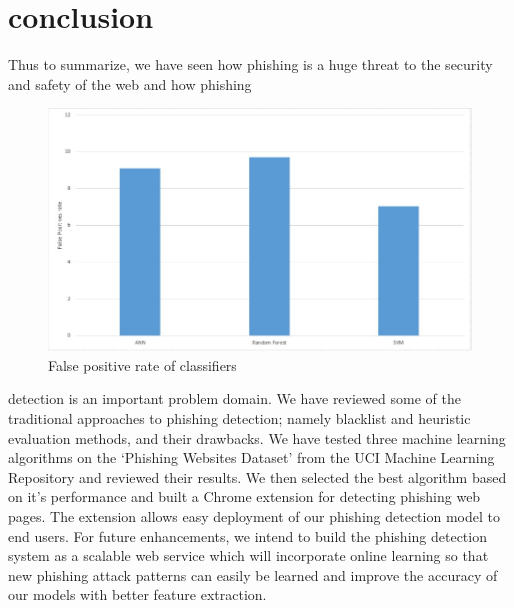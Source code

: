 \documentclass[conference]{IEEEtran}
\begin{document}
\section{conclusion}
Thus to summarize, we have seen how phishing is a huge
threat to the security and safety of the web and how phishing
\begin{figure}
    \centering
    \includegraphics[width=\linewidth]{Fig4.jpg}
    \caption{False positive rate of classifiers}
    \label{fig:4}
\end{figure}
detection is an important problem domain. We have reviewed
some of the traditional approaches to phishing detection;
namely blacklist and heuristic evaluation methods, and their
drawbacks. We have tested three machine learning algorithms
on the ‘Phishing Websites Dataset’ from the UCI Machine
Learning Repository and reviewed their results. We then selected
the best algorithm based on it’s performance and built
a Chrome extension for detecting phishing web pages. The
extension allows easy deployment of our phishing detection
model to end users. For future enhancements, we intend to
build the phishing detection system as a scalable web service
which will incorporate online learning so that new phishing
attack patterns can easily be learned and improve the accuracy
of our models with better feature extraction.

%
%
\end{document}

